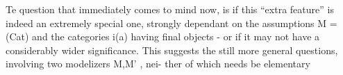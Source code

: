 Te question that immediately comes to mind now, is if this ``extra
feature'' is indeed an extremely special one, strongly dependant on the
assumptions M = (Cat) and the categories i(a) having final objects -
or if it may not have a considerably wider significance. This suggests
the still more general questions, involving two modelizers M,M' , nei-%
ther of which needs be elementary  

